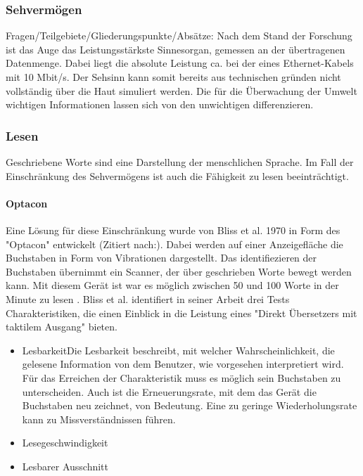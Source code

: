 \documentclass{llncs}					%
\begin{document}
\subsubsection{Sehvermögen}
Fragen/Teilgebiete/Gliederungspunkte/Absätze:
Nach dem Stand der Forschung ist das Auge das Leistungsstärkste Sinnesorgan, gemessen an der übertragenen Datenmenge\cite{Koch2006}. Dabei liegt die absolute Leistung ca. bei der eines Ethernet-Kabels mit 10 Mbit/s\cite{Koch2006}. Der Sehsinn kann somit bereits aus technischen gründen nicht vollständig über die Haut simuliert werden.
Die für die Überwachung der Umwelt wichtigen Informationen lassen sich von den unwichtigen differenzieren.
\subsubsection{Lesen} Geschriebene Worte sind eine Darstellung der menschlichen Sprache. Im Fall der Einschränkung des Sehvermögens ist auch die Fähigkeit zu lesen beeinträchtigt.

\paragraph{Optacon} Eine Lösung für diese Einschränkung wurde von Bliss et al. 1970 in Form des "Optacon" entwickelt (Zitiert nach:\cite{doi:10.1518/001872008X250638}). Dabei werden auf einer Anzeigefläche die Buchstaben in Form von Vibrationen dargestellt. Das identifiezieren der Buchstaben übernimmt ein Scanner, der über geschrieben Worte bewegt werden kann. Mit diesem Gerät ist war es möglich zwischen 50 und 100 Worte in der Minute zu lesen \cite{doi:10.1518/001872008X250638}.
Bliss et al. \cite{4081931} identifiert in seiner Arbeit drei Tests Charakteristiken, die einen Einblick in die Leistung eines "Direkt Übersetzers mit taktilem Ausgang" \cite{4081931} bieten.

\begin{itemize}
	\item Lesbarkeit\newline Die Lesbarkeit beschreibt, mit welcher Wahrscheinlichkeit, die gelesene Information von dem Benutzer, wie vorgesehen interpretiert wird. Für das Erreichen der Charakteristik muss es möglich sein Buchstaben zu unterscheiden. Auch ist die Erneuerungsrate, mit dem das Gerät die Buchstaben neu zeichnet, von Bedeutung. Eine zu geringe Wiederholungsrate kann zu Missverständnissen führen.
	\item Lesegeschwindigkeit
	\item Lesbarer Ausschnitt
\end{itemize}
\end{document}
